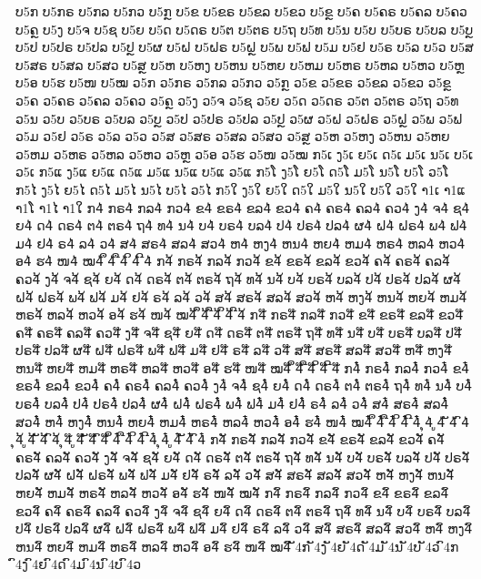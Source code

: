 {	%
	ບ5ກ ບ5ກຣ ບ5ກລ ບ5ກວ ບ5ກຼ ບ5ຂ ບ5ຂຣ ບ5ຂລ ບ5ຂວ ບ5ຂຼ ບ5ຄ ບ5ຄຣ ບ5ຄລ ບ5ຄວ ບ5ຄຼ ບ5ງ ບ5ຈ ບ5ຊ ບ5ຍ ບ5ດ ບ5ດຣ ບ5ຕ ບ5ຕຣ ບ5ຖ ບ5ທ ບ5ນ ບ5ບ ບ5ບຣ ບ5ບລ ບ5ບຼ ບ5ປ ບ5ປຣ ບ5ປລ ບ5ປຼ ບ5ຜ ບ5ຝ ບ5ຝຣ ບ5ຝຼ ບ5ພ ບ5ຟ ບ5ມ ບ5ຢ ບ5ຣ ບ5ລ ບ5ວ ບ5ສ ບ5ສຣ ບ5ສລ ບ5ສວ ບ5ສຼ ບ5ຫ ບ5ຫງ ບ5ຫນ ບ5ຫຍ ບ5ຫມ ບ5ຫຣ ບ5ຫລ ບ5ຫວ ບ5ຫຼ ບ5ອ ບ5ຮ ບ5ໜ ບ5ໝ
	ວ5ກ ວ5ກຣ ວ5ກລ ວ5ກວ ວ5ກຼ ວ5ຂ ວ5ຂຣ ວ5ຂລ ວ5ຂວ ວ5ຂຼ ວ5ຄ ວ5ຄຣ ວ5ຄລ ວ5ຄວ ວ5ຄຼ ວ5ງ ວ5ຈ ວ5ຊ ວ5ຍ ວ5ດ ວ5ດຣ ວ5ຕ ວ5ຕຣ ວ5ຖ ວ5ທ ວ5ນ ວ5ບ ວ5ບຣ ວ5ບລ ວ5ບຼ ວ5ປ ວ5ປຣ ວ5ປລ ວ5ປຼ ວ5ຜ ວ5ຝ ວ5ຝຣ ວ5ຝຼ ວ5ພ ວ5ຟ ວ5ມ ວ5ຢ ວ5ຣ ວ5ລ ວ5ວ ວ5ສ ວ5ສຣ ວ5ສລ ວ5ສວ ວ5ສຼ ວ5ຫ ວ5ຫງ ວ5ຫນ ວ5ຫຍ ວ5ຫມ ວ5ຫຣ ວ5ຫລ ວ5ຫວ ວ5ຫຼ ວ5ອ ວ5ຮ ວ5ໜ ວ5ໝ
	ກ5ເ ງ5ເ ຍ5ເ ດ5ເ ມ5ເ ນ5ເ ບ5ເ ວ5ເ
	ກ5ແ ງ5ແ ຍ5ແ ດ5ແ ມ5ແ ນ5ແ ບ5ແ ວ5ແ
	ກ5ໂ ງ5ໂ ຍ5ໂ ດ5ໂ ມ5ໂ ນ5ໂ ບ5ໂ ວ5ໂ
	ກ5ໄ ງ5ໄ ຍ5ໄ ດ5ໄ ມ5ໄ ນ5ໄ ບ5ໄ ວ5ໄ
	ກ5ໃ ງ5ໃ ຍ5ໃ ດ5ໃ ມ5ໃ ນ5ໃ ບ5ໃ ວ5ໃ
	າ1ເ າ1ແ າ1ໂ າ1ໄ າ1ໃ
	ກ4່ ກຣ4່ ກລ4່ ກວ4່ ຂ4່ ຂຣ4່ ຂລ4່ ຂວ4່ ຄ4່ ຄຣ4່ ຄລ4່ ຄວ4່ ງ4່ ຈ4່ ຊ4່ ຍ4່ ດ4່ ດຣ4່ ຕ4່ ຕຣ4່ ຖ4່ ທ4່ ນ4່ ບ4່ ບຣ4່ ບລ4່ ປ4່ ປຣ4່ ປລ4່ ຜ4່ ຝ4່ ຝຣ4່ ພ4່ ຟ4່ ມ4່ ຢ4່ ຣ4່ ລ4່ ວ4່ ສ4່ ສຣ4່ ສລ4່ ສວ4່ ຫ4່ ຫງ4່ ຫນ4່ ຫຍ4່ ຫມ4່ ຫຣ4່ ຫລ4່ ຫວ4່ ອ4່ ຮ4່ ໜ4່ ໝ4່ ຶ4່ ື4່ ິ4່ ີ4່
	ກ4້ ກຣ4້ ກລ4້ ກວ4້ ຂ4້ ຂຣ4້ ຂລ4້ ຂວ4້ ຄ4້ ຄຣ4້ ຄລ4້ ຄວ4້ ງ4້ ຈ4້ ຊ4້ ຍ4້ ດ4້ ດຣ4້ ຕ4້ ຕຣ4້ ຖ4້ ທ4້ ນ4້ ບ4້ ບຣ4້ ບລ4້ ປ4້ ປຣ4້ ປລ4້ ຜ4້ ຝ4້ ຝຣ4້ ພ4້ ຟ4້ ມ4້ ຢ4້ ຣ4້ ລ4້ ວ4້ ສ4້ ສຣ4້ ສລ4້ ສວ4້ ຫ4້ ຫງ4້ ຫນ4້ ຫຍ4້ ຫມ4້ ຫຣ4້ ຫລ4້ ຫວ4້ ອ4້ ຮ4້ ໜ4້ ໝ4້ ຶ4້ ື4້ ິ4້ ີ4້
	ກ4໊ ກຣ4໊ ກລ4໊ ກວ4໊ ຂ4໊ ຂຣ4໊ ຂລ4໊ ຂວ4໊ ຄ4໊ ຄຣ4໊ ຄລ4໊ ຄວ4໊ ງ4໊ ຈ4໊ ຊ4໊ ຍ4໊ ດ4໊ ດຣ4໊ ຕ4໊ ຕຣ4໊ ຖ4໊ ທ4໊ ນ4໊ ບ4໊ ບຣ4໊ ບລ4໊ ປ4໊ ປຣ4໊ ປລ4໊ ຜ4໊ ຝ4໊ ຝຣ4໊ ພ4໊ ຟ4໊ ມ4໊ ຢ4໊ ຣ4໊ ລ4໊ ວ4໊ ສ4໊ ສຣ4໊ ສລ4໊ ສວ4໊ ຫ4໊ ຫງ4໊ ຫນ4໊ ຫຍ4໊ ຫມ4໊ ຫຣ4໊ ຫລ4໊ ຫວ4໊ ອ4໊ ຮ4໊ ໜ4໊ ໝ4໊ ຶ4໊ ື4໊ ິ4໊ ີ4໊
	ກ4໋໋ ກຣ4໋໋ ກລ4໋໋ ກວ4໋໋ ຂ4໋໋ ຂຣ4໋໋ ຂລ4໋໋ ຂວ4໋໋ ຄ4໋໋ ຄຣ4໋໋ ຄລ4໋໋ ຄວ4໋໋ ງ4໋໋ ຈ4໋໋ ຊ4໋໋ ຍ4໋໋ ດ4໋໋ ດຣ4໋໋ ຕ4໋໋ ຕຣ4໋໋ ຖ4໋໋ ທ4໋໋ ນ4໋໋ ບ4໋໋ ບຣ4໋໋ ບລ4໋໋ ປ4໋໋ ປຣ4໋໋ ປລ4໋໋ ຜ4໋໋ ຝ4໋໋ ຝຣ4໋໋ ພ4໋໋ ຟ4໋໋ ມ4໋໋ ຢ4໋໋ ຣ4໋໋ ລ4໋໋ ວ4໋໋ ສ4໋໋ ສຣ4໋໋ ສລ4໋໋ ສວ4໋໋ ຫ4໋໋ ຫງ4໋໋ ຫນ4໋໋ ຫຍ4໋໋ ຫມ4໋໋ ຫຣ4໋໋ ຫລ4໋໋ ຫວ4໋໋ ອ4໋໋ ຮ4໋໋ ໜ4໋໋ ໝ4໋໋ ຶ4໋໋ ື4໋໋ ິ4໋໋ ີ4໋໋
	 ຸ4່ ູ4່ ັ4່ ົ4່
	 ຸ4້ ູ4້ ັ4້ ົ4້
	 ຸ4໊ ູ4໊ ັ4໊ ົ4໊
	 ຶ4໋ ື4໋ ິ4໋ ີ4໋ ຸ4໋ ູ4໋ ັ4໋ ົ4໋
	ກ4ັ ກຣ4ັ ກລ4ັ ກວ4ັ ຂ4ັ ຂຣ4ັ ຂລ4ັ ຂວ4ັ ຄ4ັ ຄຣ4ັ ຄລ4ັ ຄວ4ັ ງ4ັ ຈ4ັ ຊ4ັ ຍ4ັ ດ4ັ ດຣ4ັ ຕ4ັ ຕຣ4ັ ຖ4ັ ທ4ັ ນ4ັ ບ4ັ ບຣ4ັ ບລ4ັ ປ4ັ ປຣ4ັ ປລ4ັ ຜ4ັ ຝ4ັ ຝຣ4ັ ພ4ັ ຟ4ັ ມ4ັ ຢ4ັ ຣ4ັ ລ4ັ ວ4ັ ສ4ັ ສຣ4ັ ສລ4ັ ສວ4ັ ຫ4ັ ຫງ4ັ ຫນ4ັ ຫຍ4ັ ຫມ4ັ ຫຣ4ັ ຫລ4ັ ຫວ4ັ ອ4ັ ຮ4ັ ໜ4ັ ໝ4ັ
	ກ4ົ ກຣ4ົ ກລ4ົ ກວ4ົ ຂ4ົ ຂຣ4ົ ຂລ4ົ ຂວ4ົ ຄ4ົ ຄຣ4ົ ຄລ4ົ ຄວ4ົ ງ4ົ ຈ4ົ ຊ4ົ ຍ4ົ ດ4ົ ດຣ4ົ ຕ4ົ ຕຣ4ົ ຖ4ົ ທ4ົ ນ4ົ ບ4ົ ບຣ4ົ ບລ4ົ ປ4ົ ປຣ4ົ ປລ4ົ ຜ4ົ ຝ4ົ ຝຣ4ົ ພ4ົ ຟ4ົ ມ4ົ ຢ4ົ ຣ4ົ ລ4ົ ວ4ົ ສ4ົ ສຣ4ົ ສລ4ົ ສວ4ົ ຫ4ົ ຫງ4ົ ຫນ4ົ ຫຍ4ົ ຫມ4ົ ຫຣ4ົ ຫລ4ົ ຫວ4ົ ອ4ົ ຮ4ົ ໜ4ົ ໝ4ົ
	ັ4ກ ັ4ງ ັ4ຍ ັ4ດ ັ4ມ ັ4ນ ັ4ບ ັ4ວ
	ົ4ກ ົ4ງ ົ4ຍ ົ4ດ ົ4ມ ົ4ນ ົ4ບ ົ4ວ
}
